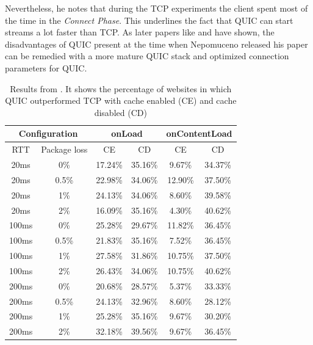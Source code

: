 \documentclass[conference]{IEEEtran}
\begin{document}
Nevertheless, he notes that during the TCP experiments the client spent most of the time in the \textit{Connect Phase}. This underlines the fact that QUIC can start streams a lot faster than TCP. As later papers like \cite{Kakhki} and \cite{Kernel} have shown, the disadvantages of QUIC present at the time when Nepomuceno released his paper can be remedied with a more mature QUIC stack and optimized connection parameters for QUIC.

\begin{table}
\begin{center}
\begin{tabular}{|cc|cc|cc|}
\hline

\multicolumn{2}{|c|}{\textbf{Configuration}} & 
\multicolumn{2}{|c|}{\textbf{onLoad}} & 
\multicolumn{2}{|c|}{\textbf{onContentLoad}} \\
\hline

RTT & Package loss & CE & CD & CE & CD \\
\hline

20ms  & 0\%   & 17.24\% & 35.16\% & 9.67\%  & 34.37\% \\
20ms  & 0.5\% & 22.98\% & 34.06\% & 12.90\% & 37.50\% \\
20ms  & 1\%   & 24.13\% & 34.06\% & 8.60\%  & 39.58\% \\
20ms  & 2\%   & 16.09\% & 35.16\% & 4.30\%  & 40.62\% \\
100ms & 0\%   & 25.28\% & 29.67\% & 11.82\% & 36.45\% \\
100ms & 0.5\% & 21.83\% & 35.16\% & 7.52\%  & 36.45\% \\
100ms & 1\%   & 27.58\% & 31.86\% & 10.75\% & 37.50\% \\
100ms & 2\%   & 26.43\% & 34.06\% & 10.75\% & 40.62\% \\
200ms & 0\%   & 20.68\% & 28.57\% & 5.37\%  & 33.33\% \\
200ms & 0.5\% & 24.13\% & 32.96\% & 8.60\%  & 28.12\% \\
200ms & 1\%   & 25.28\% & 35.16\% & 9.67\%  & 30.20\% \\
200ms & 2\%   & 32.18\% & 39.56\% & 9.67\%  & 36.45\% \\
\hline

\end{tabular}
\end{center}

\caption{Results from \cite{Nepomuceno}. It shows the percentage of websites in which QUIC outperformed TCP with cache enabled (CE) and cache disabled (CD)}
\label{table:nepomuceno-results}
\end{table}
\end{document}
